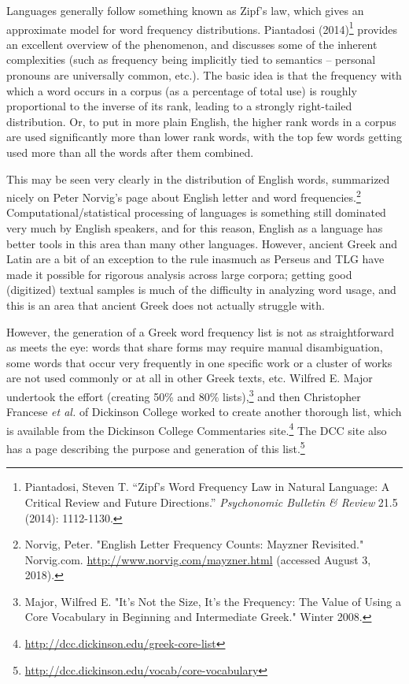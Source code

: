 \documentclass[11pt]{article}
\begin{document}
Languages generally follow something known as Zipf's law, which gives an approximate model for word frequency distributions. Piantadosi (2014)\footnote{Piantadosi, Steven T. “Zipf’s Word Frequency Law in Natural Language: A Critical Review and Future Directions.” \emph{Psychonomic Bulletin \& Review} 21.5 (2014): 1112-1130.} provides an excellent overview of the phenomenon, and discusses some of the inherent complexities (such as frequency being implicitly tied to semantics -- personal pronouns are universally common, etc.). The basic idea is that the frequency with which a word occurs in a corpus (as a percentage of total use) is roughly proportional to the inverse of its rank, leading to a strongly right-tailed distribution. Or, to put in more plain English, the higher rank words in a corpus are used significantly more than lower rank words, with the top few words getting used more than all the words after them combined.

This may be seen very clearly in the distribution of English words, summarized nicely on Peter Norvig's page about English letter and word frequencies.\footnote{Norvig, Peter. "English Letter Frequency Counts: Mayzner Revisited." Norvig.com. \url{http://www.norvig.com/mayzner.html} (accessed August 3, 2018).} Computational/statistical processing of languages is something still dominated very much by English speakers, and for this reason, English as a language has better tools in this area than many other languages. However, ancient Greek and Latin are a bit of an exception to the rule inasmuch as Perseus and TLG have made it possible for rigorous analysis across large corpora; getting good (digitized) textual samples is much of the difficulty in analyzing word usage, and this is an area that ancient Greek does not actually struggle with.

However, the generation of a Greek word frequency list is not as straightforward as meets the eye: words that share forms may require manual disambiguation, some words that occur very frequently in one specific work or a cluster of works are not used commonly or at all in other Greek texts, etc. Wilfred E. Major undertook the effort (creating 50\% and 80\% lists),\footnote{Major, Wilfred E. "It’s Not the Size, It’s the Frequency: The Value of Using a Core Vocabulary in Beginning and Intermediate Greek." Winter 2008.} and then Christopher Francese \emph{et al.} of Dickinson College worked to create another thorough list, which is available from the Dickinson College Commentaries site.\footnote{\url{http://dcc.dickinson.edu/greek-core-list}} The DCC site also has a page describing the purpose and generation of this list.\footnote{\url{http://dcc.dickinson.edu/vocab/core-vocabulary}} 
\end{document}
